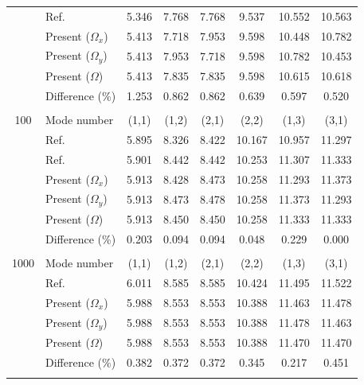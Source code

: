 \documentclass[preprint,12pt]{elsarticle}
\begin{document}
\begin{table}[!htbp]
\begin{tabular}{c l c c c c c c}
		& Ref.\Citealp{zhang2019new}  & 5.346 & 7.768 & 7.768 & 9.537 & 10.552 & 10.563 \\
		& Present ($\Omega_x$)   & 5.413      & 7.718      & 7.953     & 9.598     & 10.448      & 10.782 \\
		& Present ($\Omega_y$)   & 5.413     & 7.953     & 7.718      & 9.598    & 10.782      & 10.453
		\\ 
		& Present ($\Omega$)   &5.413      & 7.835     & 7.835     & 9.598   &  10.615    & 10.618  \\
		&Difference (\%)& 1.253     & 0.862      & 0.862      & 0.639     &  0.597     & 0.520  \\
		\\
		100 & Mode number   &  (1,1) & (1,2) & (2,1) & (2,2) & (1,3) & (3,1) \\
		& Ref.\Citealp{mukhopadhyay1979free} & 5.895& 8.326 &8.422 &10.167 &10.957 &11.297 \\
		& Ref.\Citealp{zhang2019new} & 5.901 & 8.442 & 8.442 & 10.253 & 11.307 & 11.333 \\
		& Present ($\Omega_x$)   & 5.913     & 8.428      & 8.473    & 10.258     & 11.293      & 11.373 \\
		& Present ($\Omega_y$)   & 5.913    & 8.473     & 8.478    & 10.258     & 11.373     & 11.293
		\\ 
		& Present ($\Omega$)   & 5.913     & 8.450     & 8.450     & 10.258     &  11.333    & 11.333  \\
		&Difference (\%)& 0.203     & 0.094      & 0.094      & 0.048     & 0.229     & 0.000 \\
		\\
		1000 & Mode number   & (1,1) & (1,2) & (2,1) & (2,2) & (1,3) & (3,1) \\
		& Ref.\Citealp{zhang2019new} & 6.011 & 8.585 & 8.585 & 10.424 & 11.495 & 11.522 \\
		& Present ($\Omega_x$)   & 5.988     & 8.553      & 8.553      & 10.388      & 11.463      & 11.478 \\
		& Present ($\Omega_y$)   & 5.988     & 8.553     & 8.553    & 10.388      & 11.478       & 11.463
		\\ 
		& Present ($\Omega$)   & 5.988      & 8.553    & 8.553     & 10.388    &  11.470     & 11.470  \\
		&Difference (\%)& 0.382    & 0.372      & 0.372      & 0.345     &  0.217     & 0.451
		 \\
		\\
		\bottomrule
	\end{tabular}
	\label{tab:rot1}
\end{table}
\end{document}
